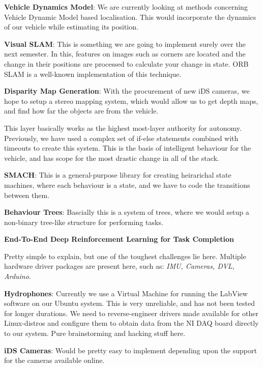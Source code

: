 \begin{DoxyItemize}
\item {\bfseries Vehicle Dynamics Model}\+: We are currently looking at methods concerning Vehicle Dynamic Model based localisation. This would incorporate the dynamics of our vehicle while estimating its position.
\item {\bfseries Visual S\+L\+AM}\+: This is something we are going to implement surely over the next semester. In this, features on images such as corners are located and the change in their positions are processed to calculate your change in state. O\+RB S\+L\+AM is a well-\/known implementation of this technique.
\item {\bfseries Disparity Map Generation}\+: With the procurement of new i\+DS cameras, we hope to setup a stereo mapping system, which would allow us to get depth maps, and find how far the objects are from the vehicle.
\end{DoxyItemize}

This layer basically works as the highest most-\/layer authority for autonomy. Previously, we have used a complex set of {\ttfamily if-\/else} statements combined with timeouts to create this system. This is the basis of intelligent behaviour for the vehicle, and has scope for the most drastic change in all of the stack.


\begin{DoxyItemize}
\item {\bfseries S\+M\+A\+CH}\+: This is a general-\/purpose library for creating heirarichal state machines, where each behaviour is a state, and we have to code the transitions between them.
\item {\bfseries Behaviour Trees}\+: Bascially this is a system of trees, where we would setup a non-\/binary tree-\/like structure for performing tasks.
\item {\bfseries End-\/\+To-\/\+End Deep Reinforcement Learning for Task Completion}
\end{DoxyItemize}

Pretty simple to explain, but one of the toughest challenges lie here. Multiple hardware driver packages are present here, such as\+: {\itshape I\+MU, Cameras, D\+VL, Arduino}.


\begin{DoxyItemize}
\item {\bfseries Hydrophones}\+: Currently we use a Virtual Machine for running the Lab\+View software on our Ubuntu system. This is very unreliable, and has not been tested for longer durations. We need to reverse-\/engineer drivers made available for other Linux-\/distros and configure them to obtain data from the NI D\+AQ board directly to our system. Pure brainstorming and hacking stuff here.
\item {\bfseries i\+DS Cameras}\+: Would be pretty easy to implement depending upon the support for the cameras available online.
\end{DoxyItemize}

